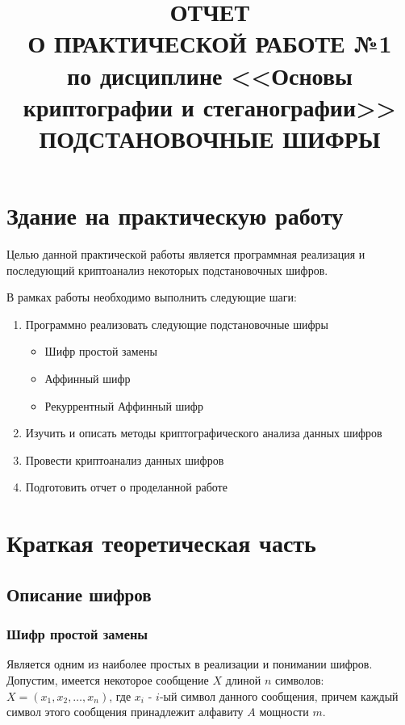 \documentclass[a4paper]{article}
\title{
  ОТЧЕТ \\
  О ПРАКТИЧЕСКОЙ РАБОТЕ №1 \\
  по дисциплине <<Основы криптографии и стеганографии>> \\
  ПОДСТАНОВОЧНЫЕ ШИФРЫ  
}
\begin{document}
  \templatedtitlepage
  
  \toc

  \section{Здание на практическую работу}

  Целью данной практической работы является программная реализация и последующий 
  криптоанализ некоторых подстановочных шифров.

  В рамках работы необходимо выполнить следующие шаги:

  \begin{enumerate}
    \setlength{\itemindent}{1cm}
    \item {
        Программно реализовать следующие подстановочные шифры 

        \begin{itemize}
            \setlength{\itemindent}{1cm}
            \item Шифр простой замены
            \item Аффинный шифр 
            \item Рекуррентный Аффинный шифр
        \end{itemize}
    }
    \item {
        Изучить и описать методы криптографического анализа данных шифров 
    }
    \item {
        Провести криптоанализ данных шифров
    }
    \item {
        Подготовить отчет о проделанной работе
    }
  \end{enumerate}
  \newpage

  \section{Краткая теоретическая часть}

  \subsection{Описание шифров}

  \subsubsection{Шифр простой замены}

  Является одним из наиболее простых в реализации и понимании шифров. Допустим,
  имеется некоторое сообщение $X$ длиной $n$ символов: $X = (x_1, x_2, \dots, x_n)$,
  где $x_i$ - $i$-ый символ данного сообщения, причем каждый символ этого сообщения принадлежит 
  алфавиту $A$ мощности $m$.
\end{document}
